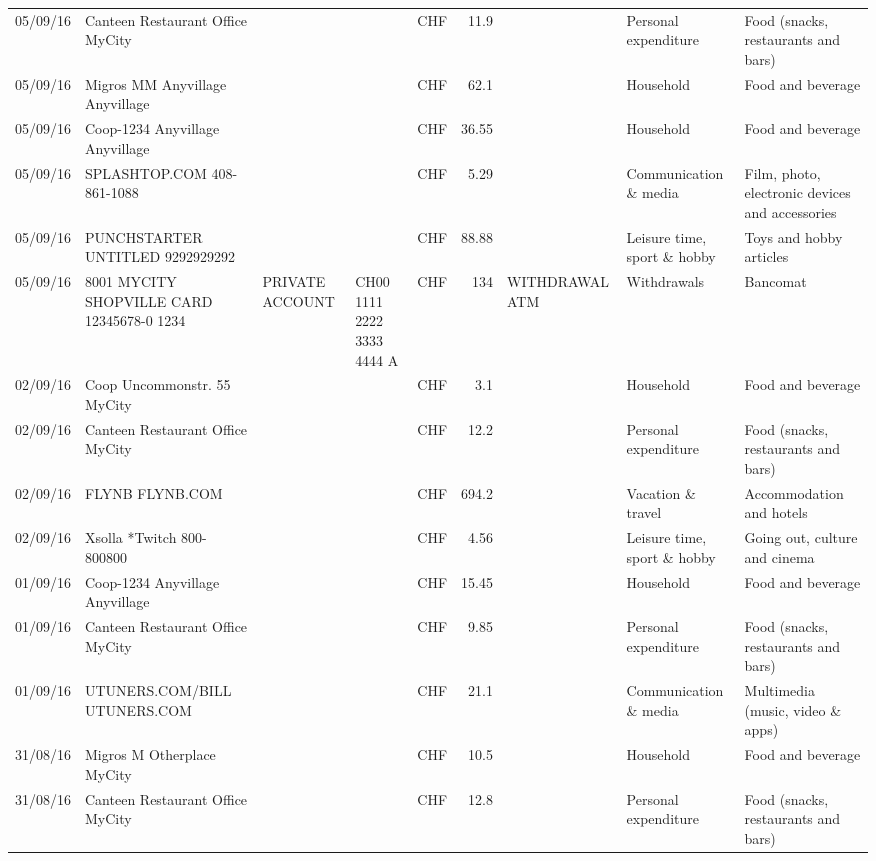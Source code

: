\begin{landscape}
\begin{table}[h]
\begin{center}
\begin{tabular}{rllllrlll}
		05/09/16 & Canteen Restaurant Office      MyCity &       &       & CHF   & 11.9  &       & Personal expenditure & Food (snacks, restaurants and bars) \\
		05/09/16 & Migros MM Anyvillage    Anyvillage &       &       & CHF   & 62.1  &       & Household & Food and beverage \\
		05/09/16 & Coop-1234 Anyvillage    Anyvillage &       &       & CHF   & 36.55 &       & Household & Food and beverage \\
		05/09/16 & SPLASHTOP.COM            408-861-1088 &       &       & CHF   & 5.29  &       & Communication \& media & Film, photo, electronic devices and accessories \\
		05/09/16 & PUNCHSTARTER UNTITLED     9292929292 &       &       & CHF   & 88.88 &       & Leisure time, sport \& hobby & Toys and hobby articles \\
		05/09/16 & 8001 MYCITY SHOPVILLE CARD 12345678-0 1234 & PRIVATE ACCOUNT & CH00 1111 2222 3333 4444 A & CHF   & 134   & WITHDRAWAL ATM & Withdrawals & Bancomat \\
		02/09/16 & Coop Uncommonstr. 55   MyCity &       &       & CHF   & 3.1   &       & Household & Food and beverage \\
		02/09/16 & Canteen Restaurant Office      MyCity &       &       & CHF   & 12.2  &       & Personal expenditure & Food (snacks, restaurants and bars) \\
		02/09/16 & FLYNB                   FLYNB.COM &       &       & CHF   & 694.2 &       & Vacation \& travel & Accommodation and hotels \\
		02/09/16 & Xsolla *Twitch           800-800800 &       &       & CHF   & 4.56  &       & Leisure time, sport \& hobby & Going out, culture and cinema \\
		01/09/16 & Coop-1234 Anyvillage    Anyvillage &       &       & CHF   & 15.45 &       & Household & Food and beverage \\
		01/09/16 & Canteen Restaurant Office      MyCity &       &       & CHF   & 9.85  &       & Personal expenditure & Food (snacks, restaurants and bars) \\
		01/09/16 & UTUNERS.COM/BILL          UTUNERS.COM &       &       & CHF   & 21.1  &       & Communication \& media & Multimedia (music, video \& apps) \\
		31/08/16 & Migros M Otherplace   MyCity &       &       & CHF   & 10.5  &       & Household & Food and beverage \\
		31/08/16 & Canteen Restaurant Office      MyCity &       &       & CHF   & 12.8  &       & Personal expenditure & Food (snacks, restaurants and bars) \\

\end{tabular}
\end{center}
\end{table}
\end{landscape}
